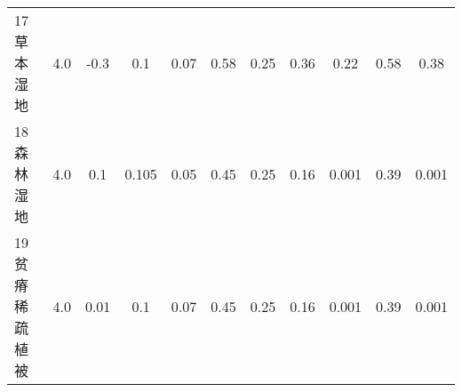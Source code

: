 \begin{sidewaystable}[]
\begin{tabular}{@{}lcccccccccc@{}}
        17 草本湿地    & 4.0        & -0.3                                                                         & 0.1                                                                                                             & 0.07                                                                                                            & 0.58                                                                                                            & 0.25                                                                                                            & 0.36                                                                                                            & 0.22                                                                                                            & 0.58                                                                                                            & 0.38                                                                                                            \\
        18 森林湿地    & 4.0        & 0.1                                                                          & 0.105                                                                                                           & 0.05                                                                                                            & 0.45                                                                                                            & 0.25                                                                                                            & 0.16                                                                                                            & 0.001                                                                                                           & 0.39                                                                                                            & 0.001                                                                                                           \\
        19 贫瘠稀疏植被  & 4.0        & 0.01                                                                         & 0.1                                                                                                             & 0.07                                                                                                            & 0.45                                                                                                            & 0.25                                                                                                            & 0.16                                                                                                            & 0.001                                                                                                           & 0.39                                                                                                            & 0.001                                                                                                           \\

\end{tabular}
\end{sidewaystable}
